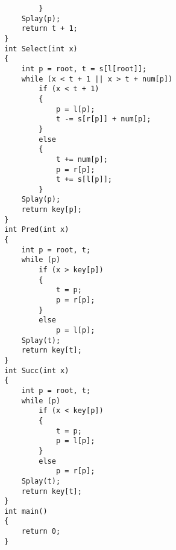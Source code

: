 \documentclass[a4paper]{article}
\begin{document}
\begin{lstlisting}
        }
    Splay(p);
    return t + 1;
}
int Select(int x)
{
    int p = root, t = s[l[root]];
    while (x < t + 1 || x > t + num[p])
        if (x < t + 1)
        {
            p = l[p];
            t -= s[r[p]] + num[p];
        }
        else
        {
            t += num[p];
            p = r[p];
            t += s[l[p]];
        }
    Splay(p);
    return key[p];
}
int Pred(int x)
{
    int p = root, t;
    while (p)
        if (x > key[p])
        {
            t = p;
            p = r[p];
        }
        else
            p = l[p];
    Splay(t);
    return key[t];
}
int Succ(int x)
{
    int p = root, t;
    while (p)
        if (x < key[p])
        {
            t = p;
            p = l[p];
        }
        else
            p = r[p];
    Splay(t);
    return key[t];
}
int main()
{
    return 0;
}
\end{lstlisting}
\end{document}
